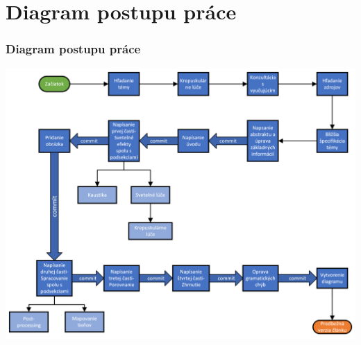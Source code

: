 \documentclass{beamer}
\begin{document}
\section*{Diagram postupu práce}

\begin{frame}[fragile=singleslide]\frametitle{Diagram postupu práce}
\begin{center}
\includegraphics[scale=.4]{Kresba1.png}
\end{center}
\end{frame}
\end{document}
